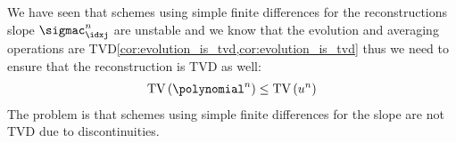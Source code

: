 \begin{sectionbox}\nospacing
    We have seen that schemes using simple finite differences for the reconstructions slope $\sigmac_{\idxj}^{n}$ are unstable and
    we know that the evolution and averaging operations are TVD\cref{cor:evolution_is_tvd,cor:evolution_is_tvd} thus we need to ensure that the reconstruction is TVD as well:
    \begin{align*}
      \text{TV}\left(\polynomial^{n}\right)\leq\text{TV} \left(u^{n}\right)
    \end{align*}
    The problem is that schemes using simple finite differences for the slope are not TVD due to discontinuities.
    \begin{figure}[H]
        \centering{
          \vspace{-1em}
          \def\svgwidth{200pt}
          \resizebox{\linewidth}{!}{}
        }
    \end{figure}
\end{sectionbox}
